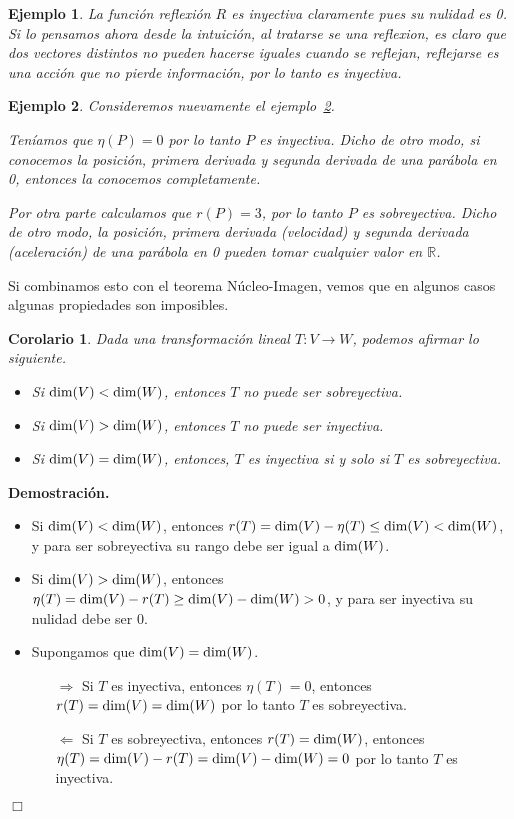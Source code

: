 \documentclass[12pt]{book}
\newtheorem{cor}{Corolario}
\newtheorem{ejem}{Ejemplo}
\def\R{\mathbb{R}}
\def\dim{\textup{dim}}
\begin{document}
\begin{ejem} La función reflexión $R$ es inyectiva claramente pues su nulidad es 0.
  Si lo pensamos ahora desde la intuición, al tratarse se una reflexion, es claro que dos vectores distintos no pueden hacerse iguales cuando se reflejan, reflejarse es una acción que no pierde información, por lo tanto es inyectiva.
\end{ejem} 

\begin{ejem}\label{parabola}
  Consideremos nuevamente el ejemplo~\ref{parabola}.
  
Teníamos que $\eta(P)=0$ por lo tanto $P$ es inyectiva.
Dicho de otro modo, si conocemos la posición, primera derivada y segunda derivada de una parábola en 0, entonces la conocemos completamente.

Por otra parte calculamos que $r(P)=3$, por lo tanto $P$ es sobreyectiva.
Dicho de otro modo, la posición, primera derivada (velocidad) y segunda derivada (aceleración) de una parábola en 0 pueden tomar cualquier valor en $\R$.
\end{ejem}


Si combinamos esto con el teorema Núcleo-Imagen, vemos que en algunos casos algunas propiedades son imposibles.

\begin{cor}
Dada una transformación lineal $T:V\rightarrow W$, podemos afirmar lo siguiente.
\begin{itemize}
\item Si $\dim(V)<\dim(W)$, entonces $T$ no puede ser sobreyectiva.
\item Si $\dim(V)>\dim(W)$, entonces $T$ no puede ser inyectiva.
\item Si $\dim(V)=\dim(W)$, entonces, $T$ es inyectiva si y solo si $T$ es sobreyectiva.
\end{itemize}
\end{cor}
{\bf Demostración.}
\begin{itemize}
\item Si $\dim(V)<\dim(W)$, entonces $r(T)=\dim(V)-\eta(T)\le \dim(V)<\dim(W)$, y para ser sobreyectiva su rango debe ser igual a $\dim(W)$.
\item Si $\dim(V)>\dim(W)$, entonces $\eta(T)=\dim(V)-r(T)\ge\dim(V)-\dim(W)>0$, y para ser inyectiva su nulidad debe ser 0.
\item Supongamos que $\dim(V)=\dim(W)$.
\begin{itemize}
\item[$\Rightarrow$] Si $T$ es inyectiva, entonces $\eta(T)=0$, entonces $r(T)=\dim(V)=\dim(W)$ por lo tanto $T$ es sobreyectiva.
\item[$\Leftarrow$] Si $T$ es sobreyectiva, entonces $r(T)=\dim(W)$, entonces $\eta(T)=\dim(V)-r(T)=\dim(V)-\dim(W)=0$ por lo tanto $T$ es inyectiva.
\end{itemize}
\end{itemize}
\hfill $\Box$
\end{document}
